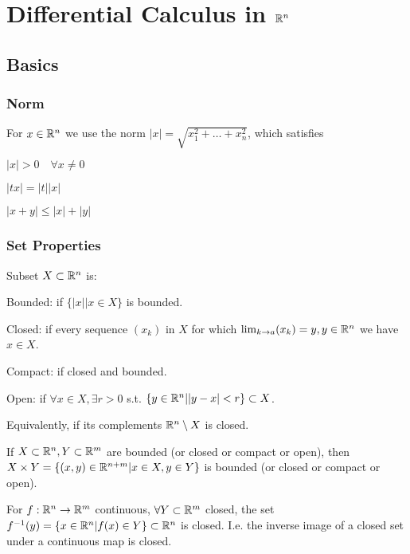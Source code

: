 
\section{Differential Calculus in $\mathbb{R}^n$}

\subsection{Basics}
\subsubsection{Norm}
For $x \in \mathbb{R}^n$ we use the norm $\left| x \right | = \sqrt{x_1^2 + \dots + x_n^2}$, which satisfies

\begin{inparaitem}
    \item $| x | > 0 \quad \forall x \neq 0$
    \item $| tx | = | t | | x |$
    \item $| x + y | \le | x | + | y |$
\end{inparaitem}

\subsubsection{Set Properties}
Subset $X \subset \mathbb{R}^n$ is:
\begin{compactdesc}
    \item[Bounded:] if $\{|x| | x \in X\}$ is bounded.
    \item[Closed:] if every sequence $(x_k)$ in $X$ for which $\lim_{k \to a} (x_k) = y, y \in \mathbb{R}^n$ we have $x \in X$.
    \item[Compact:] if closed and bounded.
    \item[Open:] if $\forall x \in X, \exists r > 0$ s.t. $\{y \in \mathbb{R}^n | |y - x| < r\} \subset X$.
        \begin{compactitem}
            \item Equivalently, if its complements $\mathbb{R}^n \setminus X$ is closed.
        \end{compactitem}
\end{compactdesc}

\begin{compactitem}
    \item If $X \subset \mathbb{R}^n, Y \subset \mathbb{R}^m$ are bounded (or closed or compact or open), then $X \times Y = \{(x, y) \in \mathbb{R}^{n+m} | x \in X, y \in Y\}$ is bounded (or closed or compact or open).
    \item For $f: \mathbb{R}^n \to \mathbb{R}^m$ continuous, $\forall Y \subset \mathbb{R}^m$ closed, the set $f^{-1}(y) = \{x \in \mathbb{R}^n | f(x) \in Y\} \subset \mathbb{R}^n$ is closed. I.e. the inverse image of a closed set under a continuous map is closed.
\end{compactitem}

